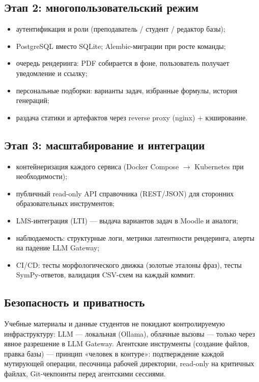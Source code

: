 \documentclass[12pt,a4paper]{article}
\begin{document}
\subsection{Этап 2: многопользовательский режим}
\begin{itemize}
  \item аутентификация и роли (преподаватель / студент / редактор базы);
  \item PostgreSQL вместо SQLite; Alembic-миграции при росте команды;
  \item очередь рендеринга: PDF собирается в фоне, пользователь получает уведомление и ссылку;
  \item персональные подборки: варианты задач, избранные формулы, история генераций;
  \item раздача статики и артефактов через reverse proxy (nginx) + кэширование.
\end{itemize}

\subsection{Этап 3: масштабирование и интеграции}
\begin{itemize}
  \item контейнеризация каждого сервиса (Docker Compose $\to$ Kubernetes при необходимости);
  \item публичный read-only API справочника (REST/JSON) для сторонних образовательных инструментов;
  \item LMS-интеграция (LTI) --- выдача вариантов задач в Moodle и аналоги;
  \item наблюдаемость: структурные логи, метрики латентности рендеринга, алерты на падение LLM Gateway;
  \item CI/CD: тесты морфологического движка (золотые эталоны фраз), тесты SymPy-ответов, валидация CSV-схем на каждый коммит.
\end{itemize}

\subsection{Безопасность и приватность}
Учебные материалы и данные студентов не покидают контролируемую инфраструктуру: LLM --- локальная (Ollama), облачные вызовы --- только через явное разрешение в LLM Gateway. Агентские инструменты (создание файлов, правка базы) --- принцип «человек в контуре»: подтверждение каждой мутирующей операции, песочница рабочей директории, read-only на критичных файлах, Git-чекпоинты перед агентскими сессиями.
\end{document}
